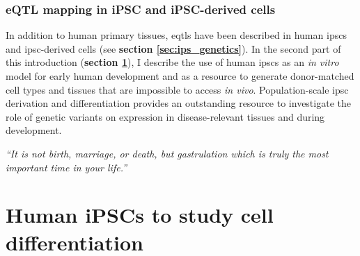 

\subsubsection{eQTL mapping in iPSC and iPSC-derived cells}

In addition to human primary tissues, \glspl{eqtl} have been described in human \glspl{ipsc} and \gls{ipsc}-derived cells (see \textbf{section \ref{sec:ips_genetics}}).
In the second part of this introduction (\textbf{section \ref{sec:human_ipscs}}), I describe the use of human \glspl{ipsc} as an \textit{in vitro} model for early human development and as a resource to generate donor-matched cell types and tissues that are impossible to access \textit{in vivo}.
Population-scale \gls{ipsc} derivation and differentiation provides an outstanding resource to investigate the role of genetic variants on expression in disease-relevant tissues and during development.



\newpage

\vspace*{10px}

\textit{“It is not birth, marriage, or death, but gastrulation which is truly the most important time in your life.”}\\

\vspace*{5px}


\section{Human iPSCs to study cell differentiation}  %
\label{sec:human_ipscs}  


